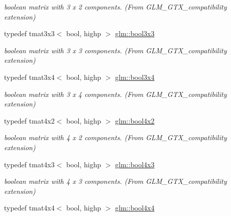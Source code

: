 \begin{DoxyCompactItemize}
\begin{DoxyCompactList}\small\item\em boolean matrix with 3 x 2 components. (From G\-L\-M\-\_\-\-G\-T\-X\-\_\-compatibility extension) \end{DoxyCompactList}\item 
\hypertarget{group__gtx__compatibility_ga5c0ded80422867674cd651ab2261f2a3}{typedef tmat3x3$<$ bool, highp $>$ \hyperlink{group__gtx__compatibility_ga5c0ded80422867674cd651ab2261f2a3}{glm\-::bool3x3}}\label{group__gtx__compatibility_ga5c0ded80422867674cd651ab2261f2a3}

\begin{DoxyCompactList}\small\item\em boolean matrix with 3 x 3 components. (From G\-L\-M\-\_\-\-G\-T\-X\-\_\-compatibility extension) \end{DoxyCompactList}\item 
\hypertarget{group__gtx__compatibility_gaf3777caf1e50112919be2939be05ae7e}{typedef tmat3x4$<$ bool, highp $>$ \hyperlink{group__gtx__compatibility_gaf3777caf1e50112919be2939be05ae7e}{glm\-::bool3x4}}\label{group__gtx__compatibility_gaf3777caf1e50112919be2939be05ae7e}

\begin{DoxyCompactList}\small\item\em boolean matrix with 3 x 4 components. (From G\-L\-M\-\_\-\-G\-T\-X\-\_\-compatibility extension) \end{DoxyCompactList}\item 
\hypertarget{group__gtx__compatibility_ga2d956a9ea3d4c8e8ec12797c9d7cb677}{typedef tmat4x2$<$ bool, highp $>$ \hyperlink{group__gtx__compatibility_ga2d956a9ea3d4c8e8ec12797c9d7cb677}{glm\-::bool4x2}}\label{group__gtx__compatibility_ga2d956a9ea3d4c8e8ec12797c9d7cb677}

\begin{DoxyCompactList}\small\item\em boolean matrix with 4 x 2 components. (From G\-L\-M\-\_\-\-G\-T\-X\-\_\-compatibility extension) \end{DoxyCompactList}\item 
\hypertarget{group__gtx__compatibility_gafd85fa864c89a6b1b4887d2790132c5c}{typedef tmat4x3$<$ bool, highp $>$ \hyperlink{group__gtx__compatibility_gafd85fa864c89a6b1b4887d2790132c5c}{glm\-::bool4x3}}\label{group__gtx__compatibility_gafd85fa864c89a6b1b4887d2790132c5c}

\begin{DoxyCompactList}\small\item\em boolean matrix with 4 x 3 components. (From G\-L\-M\-\_\-\-G\-T\-X\-\_\-compatibility extension) \end{DoxyCompactList}\item 
\hypertarget{group__gtx__compatibility_gafd4a5a69fab4d76f91ee75684f3bf2f1}{typedef tmat4x4$<$ bool, highp $>$ \hyperlink{group__gtx__compatibility_gafd4a5a69fab4d76f91ee75684f3bf2f1}{glm\-::bool4x4}}\label{group__gtx__compatibility_gafd4a5a69fab4d76f91ee75684f3bf2f1}


\end{DoxyCompactItemize}
